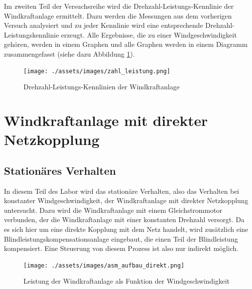 \documentclass{report}
\begin{document}
Im zweiten Teil der Versuchsreihe wird die Drehzahl-Leistungs-Kennlinie der Windkraftanlage ermittelt. Dazu werden die Messungen aus dem vorherigen Versuch analysiert und zu jeder Kennlinie wird eine entsprechende Drehzahl-Leistungskennlinie erzeugt. Alle Ergebnisse, die zu einer Windgeschwindigkeit gehören, werden in einem Graphen und alle Graphen werden in einem Diagramm zusammengefasst (siehe dazu Abbildung \ref{fig:zahl_leistung}).

\begin{figure}[!ht]
	\centering
	\texttt{[image: ./assets/images/zahl\_leistung.png]}
	\caption{Drehzahl-Leistungs-Kennlinien der Windkraftanlage}
	\label{fig:zahl_leistung}
\end{figure}

\section{Windkraftanlage mit direkter Netzkopplung}

\subsection{Stationäres Verhalten}

In diesem Teil des Labor wird das stationäre Verhalten, also das Verhalten bei konstanter Windgeschwindigkeit, der Windkraftanlage mit direkter Netzkopplung untersucht. Dazu wird die Windkraftanlage mit einem Gleichstrommotor verbunden, der die Windkraftanlage mit einer konstanten Drehzahl versorgt. Da es sich hier um eine direkte Kopplung mit dem Netz handelt, wird zusätzlich eine Blindleistungskompensationsanlage eingebaut, die einen Teil der Blindleistung kompensiert. Eine Steuerung von diesem Prozess ist also nur indirekt möglich.

\begin{figure}[!ht]
	\centering
	\texttt{[image: ./assets/images/asm\_aufbau\_direkt.png]}
	\caption{Leistung der Windkraftanlage als Funktion der Windgeschwindigkeit}
	\label{fig:aufbau_direkt}
\end{figure}
\end{document}
